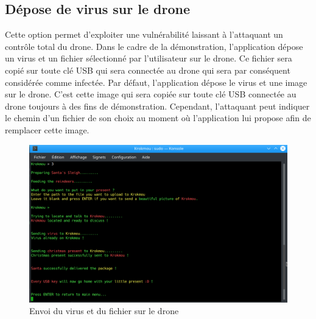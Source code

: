 \subsection{Dépose de virus sur le drone}
Cette option permet d'exploiter une vulnérabilité laissant à l'attaquant un contrôle total du drone. Dans le cadre de la démonstration, l'application dépose un virus et un fichier sélectionné par l'utilisateur sur le drone. Ce fichier sera copié sur toute clé USB qui sera connectée au drone qui sera par conséquent considérée comme infectée. Par défaut, l'application dépose le virus et une image sur le drone. C'est cette image qui sera copiée sur toute clé USB connectée au drone toujours à des fins de démonstration. Cependant, l'attaquant peut indiquer le chemin d'un fichier de son choix au moment où l'application lui propose afin de remplacer cette image.

\begin{figure}[H]
  \centering
  \includegraphics[scale=0.3]{images/virus.png}
  \caption{Envoi du virus et du fichier sur le drone}
\end{figure}
